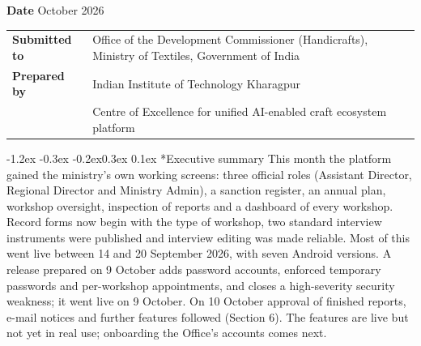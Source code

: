 \documentclass[10pt,a4paper]{article}
\makeatletter
\renewcommand\section{\@startsection{section}{1}{\z@}%
  {-1.2ex \@plus -0.3ex \@minus -0.2ex}{0.3ex \@plus 0.1ex}%
  {\normalfont\large\bfseries\color{accent}}}
\makeatother
\begin{document}
\noindent{\color{accent}\rule{\linewidth}{1.2pt}}\par\vspace{3pt}
\par\vspace{1pt}
\par\vspace{5pt}
\hfill
{\small\textbf{Date} October 2026}\par\vspace{3pt}
{\small\noindent\begin{tabularx}{\linewidth}{@{}>{\bfseries}l>{\raggedright\arraybackslash}X@{}}
Submitted to & Office of the Development Commissioner (Handicrafts), Ministry of Textiles, Government of India \\
Prepared by & Indian Institute of Technology Kharagpur \\
 & Centre of Excellence for unified AI-enabled craft ecosystem platform \\
\end{tabularx}}\par\vspace{-2pt}
\noindent{\color{accent}\rule{\linewidth}{0.4pt}}

\section*{Executive summary}
This month the platform gained the ministry's own working screens: three official roles (Assistant
Director, Regional Director and Ministry Admin), a sanction register, an annual plan, workshop
oversight, inspection of reports and a dashboard of every workshop. Record forms now begin with the
type of workshop, two standard interview instruments were published and interview editing was made
reliable. Most of this went live between 14 and 20 September 2026, with seven Android versions. A
release prepared on 9 October adds password accounts, enforced temporary passwords and per-workshop
appointments, and closes a high-severity security weakness; it went live on 9 October. On 10 October
approval of finished reports, e-mail notices and further features followed (Section 6). The features are
live but not yet in real use; onboarding the Office's accounts comes next.
\end{document}
